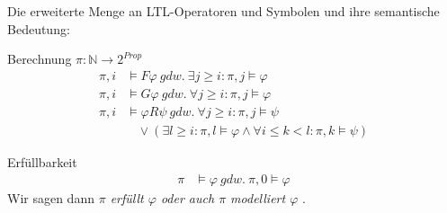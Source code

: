 \begin{frame}{\insertsubsection}
    Die erweiterte Menge an LTL-Operatoren und Symbolen und ihre semantische Bedeutung:
    \begin{block}{Berechnung $\pi : \mathbb{N} \rightarrow 2^{Prop}$}
    \vspace*{-1em}
    \begin{equation*}
        \begin{split}
            \pi, i &\models F\varphi\ gdw.\ \exists j \geq i: \pi, j \models \varphi\\
            \pi, i &\models G\varphi \ gdw.\ \forall j \geq i: \pi, j \models \varphi\\
            \pi, i &\models \varphi R\psi\ gdw.\ \forall j \geq i: \pi, j \models \psi \\
            &\ \ \ \ \lor (\exists l \geq i: \pi, l \models \varphi \land \forall i \leq k < l: \pi, k \models \psi)
        \end{split}
    \end{equation*}
    \end{block}
    \begin{block}{Erfüllbarkeit}
    \vspace*{-1em}
    \begin{equation*}
        \begin{split}
            \pi &\models \varphi\ gdw.\ \pi, 0 \models \varphi
        \end{split}
    \end{equation*}
    Wir sagen dann \textit{$\pi$ erfüllt $\varphi$ oder auch $\pi$ modelliert $\varphi$} \cite{vardi+96}.
    \end{block}
\end{frame}